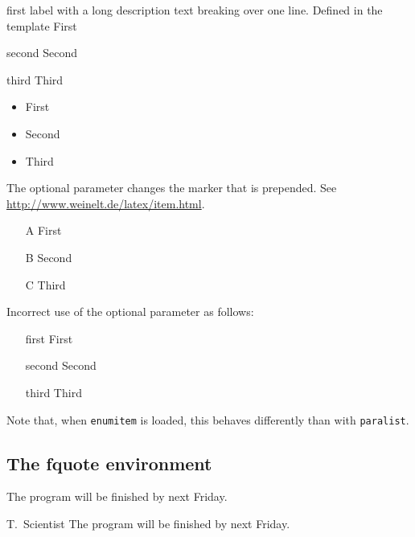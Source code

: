 \documentclass[../thesis-example]{subfiles}
\begin{document}
\begin{Description}
  \item[first label with a long description text breaking over one line. Defined in the template] First
  \item[second] Second
  \item[third] Third
\end{Description}

\begin{itemize}
  \item First
  \item Second
  \item Third
\end{itemize}

The optional parameter changes the marker that is prepended.
See \url{http://www.weinelt.de/latex/item.html}.
\begin{itemize}
  \item[A] First
  \item[B] Second
  \item[C] Third
\end{itemize}

Incorrect use of the optional parameter as follows:
\begin{itemize}
  \item[first] First
  \item[second] Second
  \item[third] Third
\end{itemize}
Note that, when \texttt{enumitem} is loaded, this behaves differently than with \texttt{paralist}.

\subsection{The fquote environment}

\begin{fquote}[T.\ Scientist]
  The program will be finished by next Friday.
\end{fquote}

\begin{gfquote}{T.\ Scientist}
  The program will be finished by next Friday.
\end{gfquote}
\end{document}
